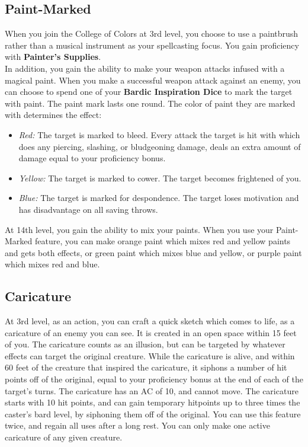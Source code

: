 \subsection{Paint-Marked}
When you join the College of Colors at 3rd level, you choose to use a paintbrush rather than a musical instrument as your spellcasting focus. You gain proficiency with \textbf{Painter's Supplies}.\\
In addition, you gain the ability to make your weapon attacks infused with a magical paint. When you make a successful weapon attack against an enemy, you can choose to spend one of your \textbf{Bardic Inspiration Dice} to mark the target with paint. The paint mark lasts one round. The color of paint they are marked with determines the effect:
\begin{itemize}
    \item \textit{Red:} The target is marked to bleed. Every attack the target is hit with which does any piercing, slashing, or bludgeoning damage, deals an extra amount of damage equal to your proficiency bonus.
    \item \textit{Yellow:} The target is marked to cower. The target becomes frightened of you.
    \item \textit{Blue:} The target is marked for despondence. The target loses motivation and has disadvantage on all saving throws.
\end{itemize}
At 14th level, you gain the ability to mix your paints. When you use your Paint-Marked feature, you can make orange paint which mixes red and yellow paints and gets both effects, or green paint which mixes blue and yellow, or purple paint which mixes red and blue.
\subsection{Caricature}
At 3rd level, as an action, you can craft a quick sketch which comes to life, as a caricature of an enemy you can see. It is created in an open space within 15 feet of you. The caricature counts as an illusion, but can be targeted by whatever effects can target the original creature. While the caricature is alive, and within 60 feet of the creature that inspired the caricature, it siphons a number of hit points off of the original, equal to your proficiency bonus at the end of each of the target's turns. The caricature has an AC of 10, and cannot move. The caricature starts with 10 hit points, and can gain temporary hitpoints up to three times the caster's bard level, by siphoning them off of the original. You can use this feature twice, and regain all uses after a long rest. You can only make one active caricature of any given creature.
